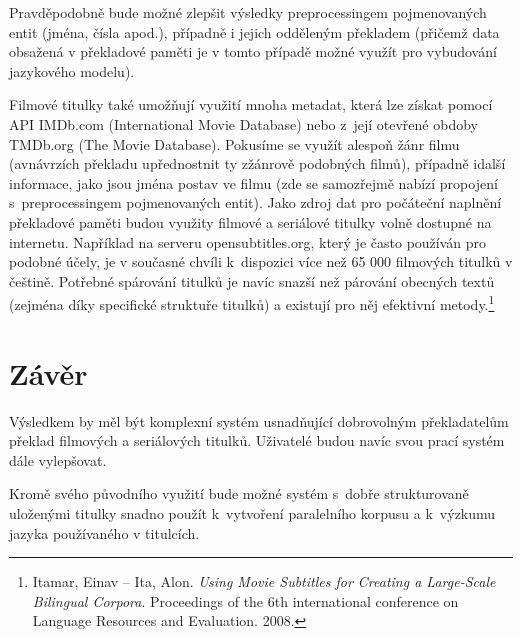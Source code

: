 Pravděpodobně bude možné zlepšit výsledky preprocessingem pojmenovaných entit (jména, čísla apod.), případně i jejich odděleným překladem (přičemž data obsažená v překladové paměti je v tomto případě možné využít pro vybudování jazykového modelu).

Filmové titulky také umožňují využití mnoha metadat, která lze získat pomocí API IMDb.com (International Movie Database) nebo z~její otevřené obdoby TMDb.org (The Movie Database). Pokusíme se využít alespoň žánr filmu (avnávrzích překladu upřednostnit ty zžánrově podobných filmů), případně idalší informace, jako jsou jména postav ve filmu (zde se samozřejmě nabízí propojení s~preprocessingem pojmenovaných entit).
Jako zdroj dat pro počáteční naplnění překladové paměti budou využity filmové a seriálové titulky volně dostupné na internetu. Například na serveru opensubtitles.org, který je často používán pro podobné účely, je v současné chvíli k~dispozici více než 65 000 filmových titulků v češtině. Potřebné spárování titulků je navíc snazší než párování obecných textů (zejména díky specifické struktuře titulků) a existují pro něj efektivní metody.\footnote{Itamar, Einav – Ita, Alon. \emph{Using Movie Subtitles for Creating a Large-Scale Bilingual Corpora}. Proceedings of the 6th international conference on Language Resources and Evaluation. 2008.}

\section{Závěr}
Výsledkem by měl být komplexní systém usnadňující dobrovolným překladatelům překlad filmových a seriálových titulků. Uživatelé budou navíc svou prací systém dále vylepšovat.

Kromě svého původního využití bude možné systém s~dobře strukturovaně uloženými titulky snadno použít k~vytvoření paralelního korpusu a k~výzkumu jazyka používaného v titulcích.